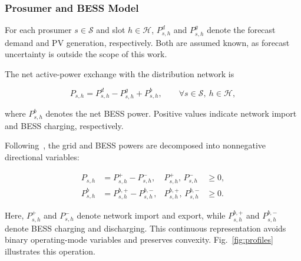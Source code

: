 \documentclass[journal]{IEEEtran}
\begin{document}
\subsubsection{Prosumer and BESS Model}
\label{sssec:prosumer_bess}

For each prosumer \(s\in\mathcal{S}\) and slot \(h\in\mathcal{H}\), \(P^{d}_{s,h}\) and \(P^{g}_{s,h}\) denote the forecast demand and PV generation, respectively. Both are assumed known, as forecast uncertainty is outside the scope of this work.

The net active-power exchange with the distribution network is

\begin{equation}
\label{eq:prosumer_balance}
P_{s,h}
=
P^{d}_{s,h}
-
P^{g}_{s,h}
+
P^{b}_{s,h},
\qquad
\forall s\in\mathcal{S},\ h\in\mathcal{H},
\end{equation}

where \(P^{b}_{s,h}\) denotes the net BESS power. Positive values indicate network import and BESS charging, respectively.

Following~\cite{gutierrez2021}, the grid and BESS powers are decomposed into nonnegative directional variables:

\begin{subequations}
\label{eq:power_splits}
\begin{align}
P_{s,h}
&=
P^{+}_{s,h}-P^{-}_{s,h},
&
P^{+}_{s,h},\,P^{-}_{s,h}
&\geq0,
\label{eq:grid_split}
\\
P^{b}_{s,h}
&=
P^{b,+}_{s,h}-P^{b,-}_{s,h},
&
P^{b,+}_{s,h},\,P^{b,-}_{s,h}
&\geq0.
\label{eq:batt_split}
\end{align}
\end{subequations}

Here, \(P^{+}_{s,h}\) and \(P^{-}_{s,h}\) denote network import and export, while \(P^{b,+}_{s,h}\) and \(P^{b,-}_{s,h}\) denote BESS charging and discharging. This continuous representation avoids binary operating-mode variables and preserves convexity. Fig.~\ref{fig:profiles} illustrates this operation.
\end{document}
